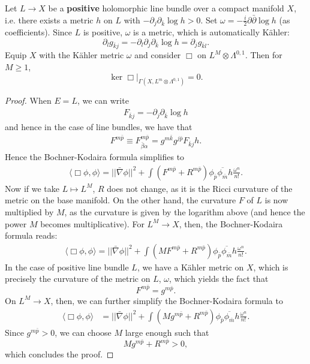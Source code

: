 \documentclass{../mathnotes}
\begin{document}
\begin{cor}
Let $L\to X$ be a \textbf{positive} holomorphic line bundle over a compact manifold $X$, i.e. there exists a metric $h$ on $L$
with $-\partial_{j}\partial_{\bar k}\log h>0$. Set $\omega=-\frac{i}{2}\partial\bar\partial\log h$ (as coefficients). Since $L$ is positive, $\omega$ is a metric, which
is automatically K\"ahler:
\[\partial_l g_{\bar kj}=-\partial_l\partial_j\partial_{\bar k}\log h=\partial_j g_{\bar kl}.\]
Equip $X$ with the K\"ahler metric $\omega$ and consider $\Box$ on $L^M\otimes\Lambda^{0,1}$.
Then for $M\geq 1$,
\[\ker\Box\bigg|_{\Gamma(X,L^m\otimes\Lambda^{0,1})}=0.\]
\end{cor}
\begin{proof}
    When $E=L$, we can write
    \begin{align*}
        F_{\bar kj}=-\partial_j\partial_{\bar k}\log h
    \end{align*}
    and hence in the case of line bundles, we have that
    \begin{align*}
        F^{m\bar p}\equiv F^{m\bar p}_{\bar\beta\alpha}=g^{m\bar k}g^{j\bar p}F_{\bar kj}h.
    \end{align*}
    Hence the Bochner-Kodaira formula simplifies to
    \begin{align*}
        \langle\Box\phi,\phi\rangle=||\bar\nabla\phi||^2+\int (F^{m\bar p}+R^{m\bar p})\phi_{\bar p}\overline{\phi_{\bar m}}h\frac{\omega^n}{n!}.
    \end{align*}
    Now if we take $L\mapsto L^M$, $R$ does not change, as it is the Ricci curvature of the metric on the base manifold. On the other hand,
    the curvature $F$ of $L$ is now multiplied by $M$, as the curvature is given by the logarithm above (and hence the power $M$ becomes
    multiplicative). For $L^M\to X$, then, the Bochner-Kodaira formula reads:
    \begin{align*}
        \langle\Box\phi,\phi\rangle=||\bar\nabla\phi||^2+\int (MF^{m\bar p}+R^{m\bar p})\phi_{\bar p}\overline{\phi_{\bar m}}h\frac{\omega^n}{n!}.
    \end{align*}
    In the case of positive line bundle $L$, we have a K\"ahler metric on $X$, which is precisely the curvature of the metric on $L$, $\omega$,
    which yields the fact that
    \[F^{m\bar p}=g^{m\bar p}.\]
    On $L^M\to X$, then, we can further simplify the Bochner-Kodaira formula to
    \begin{align*}
        \langle\Box\phi,\phi\rangle&=||\bar\nabla\phi||^2+\int (Mg^{m\bar p}+R^{m\bar p})\phi_{\bar p}\overline{\phi_{\bar m}}h\frac{\omega^n}{n!}.
    \end{align*}
    Since $g^{m\bar p}>0$, we can choose $M$ large enough such that
    \[Mg^{m\bar p}+R^{m\bar p}>0,\]
    which concludes the proof.
\end{proof}
\end{document}
